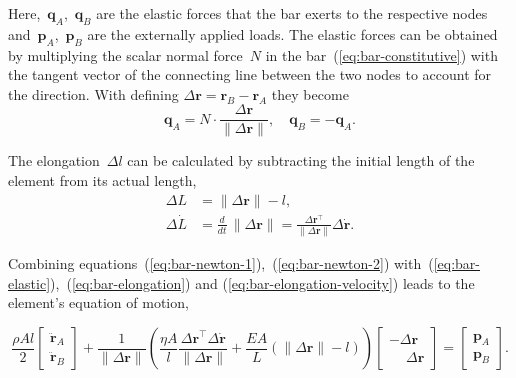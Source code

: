 Here,~$\boldsymbol{q}_A$,~$\boldsymbol{q}_B$ are the elastic forces that the bar exerts to the respective nodes and~$\boldsymbol{p}_A$,~$\boldsymbol{p}_B$ are the externally applied loads. The elastic forces can be obtained by multiplying the scalar normal force~$N$ in the bar~(\ref{eq:bar-constitutive}) with the tangent vector of the connecting line between the two nodes to account for the direction.
With defining $\Delta\boldsymbol{r} = \boldsymbol{r}_B - \boldsymbol{r}_A$ they become
%
\begin{equation}
\boldsymbol{q}_A = N\cdot\frac{\Delta\boldsymbol{r}}{\lVert\Delta\boldsymbol{r}\rVert},\quad \boldsymbol{q}_B = -\boldsymbol{q}_A.\label{eq:bar-elastic}
\end{equation}

The elongation~$\Delta l$ can be calculated by subtracting the initial length of the element from its actual length,
%
\begin{align}
\Delta L &= \lVert\Delta\boldsymbol{r}\rVert - l,\label{eq:bar-elongation} \\
\Delta \dot{L} &= \frac{d}{dt}\,\lVert\Delta\boldsymbol{r}\rVert = \frac{\Delta\boldsymbol{r}^\intercal}{\lVert\Delta\boldsymbol{r}\rVert}\Delta\dot{\boldsymbol{r}}.\label{eq:bar-elongation-velocity}
\end{align}

Combining equations~(\ref{eq:bar-newton-1}),~(\ref{eq:bar-newton-2}) with~(\ref{eq:bar-elastic}),~(\ref{eq:bar-elongation}) and (\ref{eq:bar-elongation-velocity}) leads to the element's equation of motion,

\begin{equation}
\frac{\rho Al}{2}
\begin{bmatrix}
\ddot{\boldsymbol{r}}_A \\ \ddot{\boldsymbol{r}}_B
\end{bmatrix}
+
\frac{1}{\lVert\Delta\boldsymbol{r}\rVert}
\left(
\frac{\eta A}{l}
\frac{\Delta\boldsymbol{r}^\intercal\Delta\dot{\boldsymbol{r}}}{\lVert\Delta\boldsymbol{r}\rVert}
+
\frac{EA}{L}\left(\lVert\Delta\boldsymbol{r}\rVert - l\right)
\right)
\begin{bmatrix}
-\Delta\boldsymbol{r} \\ \phantom{-}\Delta\boldsymbol{r}
\end{bmatrix}
=
\begin{bmatrix}
\boldsymbol{p}_A \\ \boldsymbol{p}_B
\end{bmatrix}.
\end{equation}

